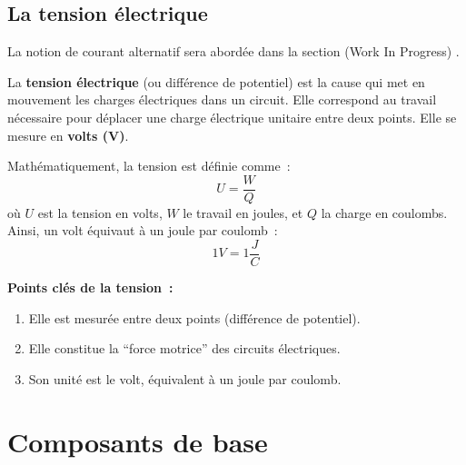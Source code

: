 \subsection{La tension \'electrique}
\begin{Note}
	La notion de courant alternatif sera abord\'ee dans la section (Work In Progress) .
\end{Note}
La \textbf{tension \'electrique} (ou diff\'erence de potentiel) est la cause qui met en mouvement les charges \'electriques dans un circuit. Elle correspond au travail n\'ecessaire pour d\'eplacer une charge \'electrique unitaire entre deux points. Elle se mesure en \textbf{volts (\unit{\volt})}.\par
Math\'ematiquement, la tension est d\'efinie comme~:
\[
  U = \frac{W}{Q}
\]
où \(U\) est la tension en volts, \(W\) le travail en joules, et \(Q\) la charge en coulombs. Ainsi, un volt \'equivaut à un joule par coulomb~:
\[
1V=1\frac{J}{C}
\]
\vspace{\baselineskip}
\begin{Note}
\textbf{Points cl\'es de la tension~:}
\begin{enumerate}
  \item Elle est mesur\'ee entre deux points (diff\'erence de potentiel).
  \item Elle constitue la “force motrice” des circuits \'electriques.
  \item Son unit\'e est le volt, \'equivalent à un joule par coulomb.
\end{enumerate}
\end{Note}

\section{Composants de base} \label{subsec:basic_components}

